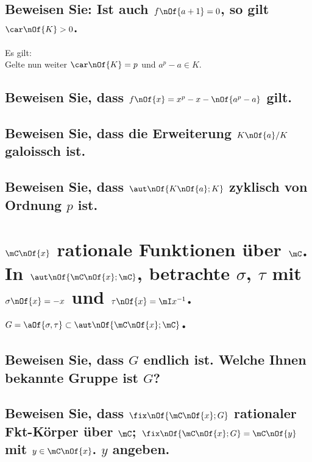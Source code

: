 \documentclass[11pt,a4paper]{scrartcl}
\begin{document}
\subsection{Beweisen Sie: Ist auch $f\nOf{a + 1} = 0$, so gilt $\car\nOf{K} > 0$.}
Es gilt:
\\ Gelte nun weiter $\car\nOf{K} = p$ und $a^p - a \in K$.
\subsection{Beweisen Sie, dass $f\nOf{x} = x^p - x - \nOf{a^p - a}$ gilt.}

\subsection{Beweisen Sie, dass die Erweiterung $K\nOf{a}/K$ galoissch ist.}

\subsection{Beweisen Sie, dass $\aut\nOf{K\nOf{a};K}$ zyklisch von Ordnung $p$ ist.}

\section{$\mC\nOf{x}$ rationale Funktionen über $\mC$. In $\aut\nOf{\mC\nOf{x};\mC}$, betrachte $\sigma$, $\tau$ mit $\sigma\nOf{x} = - x$ und $\tau\nOf{x} = \mI x^{-1}$. $G = \aOf{\sigma,\tau}\subset \aut\nOf{\mC\nOf{x};\mC}$.}

\subsection{Beweisen Sie, dass $G$ endlich ist. Welche Ihnen bekannte Gruppe ist $G$?}

\subsection{Beweisen Sie, dass $\fix\nOf{\mC\nOf{x};G}$ rationaler Fkt-Körper über $\mC$; $\fix\nOf{\mC\nOf{x};G} = \mC\nOf{y}$ mit $y\in\mC\nOf{x}$. $y$ angeben.}
\end{document}
